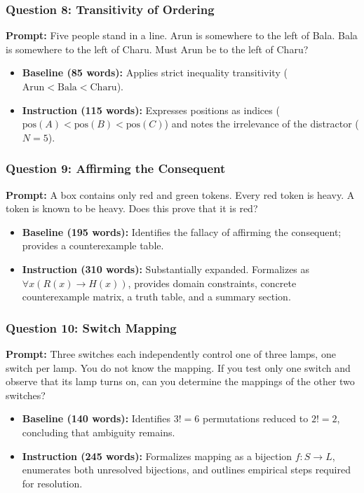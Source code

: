 \documentclass[11pt,a4paper]{article}
\begin{document}
\subsubsection{Question 8: Transitivity of Ordering}
\textbf{Prompt:} Five people stand in a line. Arun is somewhere to the left of Bala. Bala is somewhere to the left of Charu. Must Arun be to the left of Charu?
\begin{itemize}[leftmargin=*]
    \item \textbf{Baseline (85 words):} Applies strict inequality transitivity ($\text{Arun} < \text{Bala} < \text{Charu}$).
    \item \textbf{Instruction (115 words):} Expresses positions as indices ($\text{pos}(A) < \text{pos}(B) < \text{pos}(C)$) and notes the irrelevance of the distractor ($N=5$).
\end{itemize}

\subsubsection{Question 9: Affirming the Consequent}
\textbf{Prompt:} A box contains only red and green tokens. Every red token is heavy. A token is known to be heavy. Does this prove that it is red?
\begin{itemize}[leftmargin=*]
    \item \textbf{Baseline (195 words):} Identifies the fallacy of affirming the consequent; provides a counterexample table.
    \item \textbf{Instruction (310 words):} Substantially expanded. Formalizes as $\forall x (R(x) \to H(x))$, provides domain constraints, concrete counterexample matrix, a truth table, and a summary section.
\end{itemize}

\subsubsection{Question 10: Switch Mapping}
\textbf{Prompt:} Three switches each independently control one of three lamps, one switch per lamp. You do not know the mapping. If you test only one switch and observe that its lamp turns on, can you determine the mappings of the other two switches?
\begin{itemize}[leftmargin=*]
    \item \textbf{Baseline (140 words):} Identifies $3! = 6$ permutations reduced to $2! = 2$, concluding that ambiguity remains.
    \item \textbf{Instruction (245 words):} Formalizes mapping as a bijection $f: S \to L$, enumerates both unresolved bijections, and outlines empirical steps required for resolution.
\end{itemize}
\end{document}
